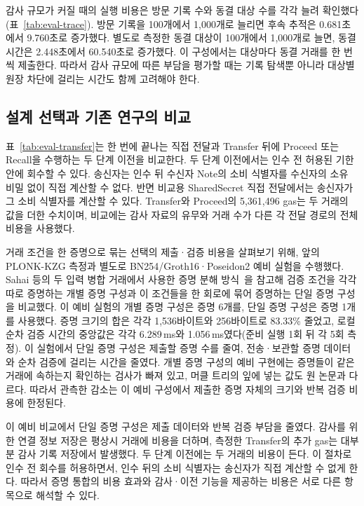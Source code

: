 감사 규모가 커질 때의 실행 비용은 방문 기록 수와 동결 대상 수를
각각 늘려 확인했다(표~\ref{tab:eval-trace}). 방문 기록을 100개에서
1,000개로 늘리면 후속 추적은 0.681초에서 9.760초로 증가했다.
별도로 측정한 동결 대상이 100개에서 1,000개로 늘면,
동결 시간은 2.448초에서 60.540초로 증가했다.
이 구성에서는 대상마다 동결 거래를 한 번씩 제출한다.
따라서 감사 규모에 따른 부담을 평가할 때는 기록 탐색뿐 아니라
대상별 원장 차단에 걸리는 시간도 함께 고려해야 한다.


\subsection{설계 선택과 기존 연구의 비교}

표~\ref{tab:eval-transfer}는 한 번에 끝나는 직접 전달과
Transfer 뒤에 Proceed 또는 Recall을 수행하는 두 단계 이전을 비교한다.
두 단계 이전에서는 인수 전 허용된 기한 안에 회수할 수 있다.
송신자는 인수 뒤 수신자 Note의 소비 식별자를
수신자의 소유 비밀 없이 직접 계산할 수 없다.
반면 비교용 SharedSecret 직접 전달에서는 송신자가 그
소비 식별자를 계산할 수 있다.
Transfer와 Proceed의 5,361,496 gas는 두 거래의 값을
더한 수치이며, 비교에는 감사 자료의 유무와 거래 수가 다른
각 전달 경로의 전체 비용을 사용했다.


거래 조건을 한 증명으로 묶는 선택의 제출·검증 비용을 살펴보기 위해, 앞의
PLONK-KZG 측정과 별도로 BN254/Groth16·Poseidon2
예비 실험을 수행했다.
Sahai 등의 두 입력 병합 거래에서 사용한 증명 분해
방식~\cite{sahai-supply-chain-2020}을 참고해
검증 조건을 각각 따로 증명하는 개별 증명 구성과
이 조건들을 한 회로에 묶어 증명하는 단일 증명 구성을 비교했다.
이 예비 실험의 개별 증명 구성은 증명 6개를,
단일 증명 구성은 증명 1개를 사용했다.
증명 크기의 합은 각각 1,536바이트와
256바이트로 83.33\% 줄었고,
로컬 순차 검증 시간의 중앙값은 각각 6.289\,ms와
1.056\,ms였다(준비 실행 1회 뒤 각 5회 측정).
이 실험에서 단일 증명 구성은 제출할 증명 수를 줄여,
전송·보관할 증명 데이터와 순차 검증에 걸리는 시간을 줄였다.
개별 증명 구성의 예비 구현에는 증명들이 같은 거래에 속하는지
확인하는 검사가 빠져 있고, 머클 트리의 잎에 넣는 값도 원 논문과 다르다.
따라서 관측한 감소는 이 예비 구성에서 제출한 증명 자체의 크기와
반복 검증 비용에 한정된다.

이 예비 비교에서 단일 증명 구성은 제출 데이터와 반복 검증 부담을 줄였다.
감사를 위한 연결 정보 저장은 평상시 거래에 비용을 더하며,
측정한 Transfer의 추가 gas는 대부분 감사 기록 저장에서 발생했다.
두 단계 이전에는 두 거래의 비용이 든다. 이 절차로 인수 전 회수를
허용하면서, 인수 뒤의 소비 식별자는 송신자가 직접 계산할 수 없게 한다.
따라서 증명 통합의 비용 효과와 감사·이전 기능을 제공하는 비용은
서로 다른 항목으로 해석할 수 있다.
